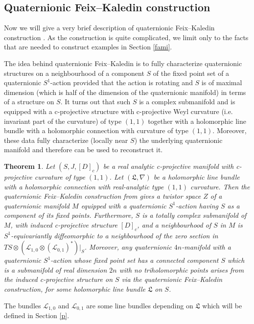 \documentclass{amsart}
\newtheorem{thm}{Theorem}[section]
\begin{document}
\subsection{Quaternionic Feix--Kaledin construction} Now we will give a very brief description of quaternionic Feix--Kaledin construction \cite{BC}. As the construction is quite complicated, we limit only to the facts that are needed to construct examples in Section \ref{fami}. 

The idea behind quaternionic Feix--Kaledin is to fully characterize quaternionic structures on a neighbourhood of a component $S$ of the fixed point set of a quaternionic $S^1$-action provided that the action is rotating and $S$ is of maximal dimension (which is half of the dimension of the quaternionic manifold) in terms of a structure on $S$. It turns out that such $S$ is a complex submanifold and is equipped with a c-projective structure with c-projective Weyl curvature (i.e. invariant part of the curvature) of type $(1,1)$ together with a holomorphic line bundle with a holomorphic connection with curvature of type $(1,1)$. Moreover, these data fully characterize (locally near $S$) the underlying quaternionic manifold and therefore can be used to reconstruct it. 

\begin{thm}{\cite{BC}}
    Let $(S,J,[D]_c)$ be a real analytic c-projective manifold with c-projective curvature of type $(1,1)$. Let $(\mathfrak{L},\nabla)$ be a holomorphic line bundle with a holomorphic connection with real-analytic type $(1,1)$ curvature. Then the quaternionic Feix--Kaledin construction from \cite{BC} gives a twistor space $Z$ of a quaternionic manifold $M$ equipped with a quaternionic $S^1$-action having $S$ as a component of its fixed points.  Furthermore, $S$ is a totally complex submanifold of $M$, with induced c-projective structure $[D]_c$, and a neighbourhood of $S$ in $M$ is
$S^1$-equivariantly diffeomorphic to a neighbourhood of the zero section in
$TS\otimes(\mathcal{L}_{1,0}\otimes(\mathcal{L}_{0,1})^*)|_S$. Moreover, any quaternionic
$4n$-manifold with a quaternionic $S^1$-action whose fixed point set has a
connected component $S$ which is a submanifold of real dimension $2n$ with no
triholomorphic points arises from the induced c-projective structure on $S$ via the
quaternionic Feix--Kaledin construction, for some holomorphic line bundle $\mathfrak{L}$ on
$S$.
\end{thm}

The bundles $\mathcal{L}_{1,0}$ and $\mathcal{L}_{0,1}$ are some line bundles depending on $\mathfrak{L}$ which will be defined in Section \ref{p}.
\end{document}
